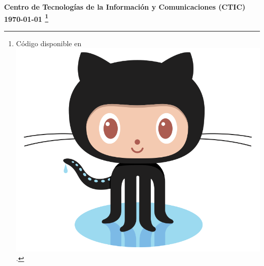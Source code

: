 \documentclass[spanish,addpoints,answers,a4paper]{exam}
\newcommand{\unmarkedfntext}[1]{%
	\begingroup
	\renewcommand\thefootnote{}\footnote{#1}%
	\addtocounter{footnote}{-1}%
	\endgroup
}
\newcommand{\mychar}{%
	\begingroup\normalfont
	\includegraphics[height=\fontcharht\font`\B]{Octocat.png}%
	\endgroup
}
\begin{document}
\begin{flushright}\bfseries
Centro de Tecnologías de la Información y Comunicaciones (CTIC)\\[2mm]
\today\unmarkedfntext{Código disponible en \href{https://github.com/carlosal1015/Cpp-Programming}{\mychar{}}.}
\end{flushright}
\end{document}
